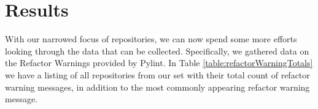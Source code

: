 \chapter{Results} \label{chapterResults}


With our narrowed focus of repositories, we can now spend some more efforts looking through the data that can be collected. Specifically, we gathered data on the Refactor Warnings provided by Pylint. In Table \ref{table:refactorWarningTotals} we have a listing of all repositories from our set with their total count of refactor warning messages, in addition to the most commonly appearing refactor warning message.

